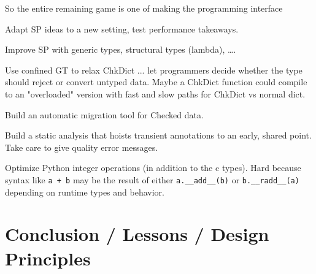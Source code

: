 \documentclass[english,cleveref,submission]{programming}
\newcommand{\code}[1]{\texttt{#1}}
\begin{document}
       So the entire remaining game is one of making the programming interface

Adapt SP ideas to a new setting, test performance takeaways.

Improve SP with generic types, structural types (lambda), \ldots.

Use confined GT to relax ChkDict ... let programmers decide whether
the type should reject or convert untyped data.
Maybe a ChkDict function could compile to an "overloaded" version with
fast and slow paths for ChkDict vs normal dict.

Build an automatic migration tool for Checked data.

Build a static analysis that hoists transient annotations to an early, shared point.
Take care to give quality error messages.

Optimize Python integer operations (in addition to the c types).
Hard because syntax like \code{a + b} may be the result of either \code{a.\_\_add\_\_(b)}
or \code{b.\_\_radd\_\_(a)} depending on runtime types and behavior.


\section{Conclusion / Lessons / Design Principles}
\label{s:conclusion}

\end{document}
